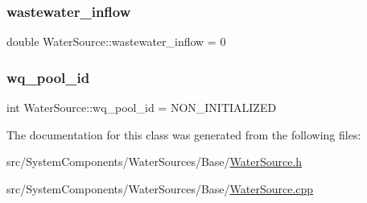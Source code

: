 \subsubsection{\texorpdfstring{wastewater\+\_\+inflow}{wastewater\_inflow}}
{\footnotesize\ttfamily double Water\+Source\+::wastewater\+\_\+inflow = 0\hspace{0.3cm}{\ttfamily [protected]}}

\mbox{\label{classWaterSource_acef73d9b1675fb6db9ec39347514db6d}} 
\subsubsection{\texorpdfstring{wq\+\_\+pool\+\_\+id}{wq\_pool\_id}}
{\footnotesize\ttfamily int Water\+Source\+::wq\+\_\+pool\+\_\+id = N\+O\+N\+\_\+\+I\+N\+I\+T\+I\+A\+L\+I\+Z\+ED\hspace{0.3cm}{\ttfamily [protected]}}



The documentation for this class was generated from the following files\+:\begin{DoxyCompactItemize}
\item 
src/\+System\+Components/\+Water\+Sources/\+Base/\mbox{\hyperlink{WaterSource_8h}{Water\+Source.\+h}}\item 
src/\+System\+Components/\+Water\+Sources/\+Base/\mbox{\hyperlink{WaterSource_8cpp}{Water\+Source.\+cpp}}\end{DoxyCompactItemize}
